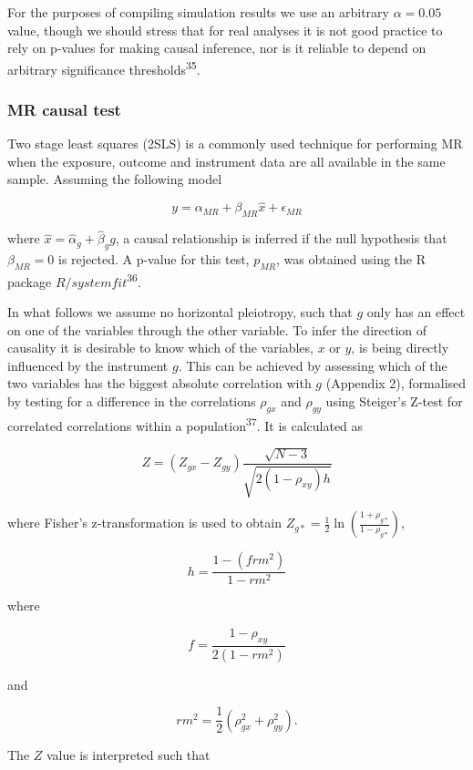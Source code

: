 \documentclass[]{article}
\begin{document}
For the purposes of compiling simulation results we use an arbitrary
\(\alpha = 0.05\) value, though we should stress that for real analyses
it is not good practice to rely on p-values for making causal inference,
nor is it reliable to depend on arbitrary significance
thresholds\textsuperscript{35}.

\subsubsection{MR causal test}\label{mr-causal-test}

Two stage least squares (2SLS) is a commonly used technique for
performing MR when the exposure, outcome and instrument data are all
available in the same sample. Assuming the following model

\[
y = \alpha_{MR} + \beta_{MR} \hat{x} + \epsilon_{MR}
\]

where \(\hat{x} = \hat{\alpha}_g + \hat{\beta}_g g\), a causal
relationship is inferred if the null hypothesis that \(\beta_{MR} = 0\)
is rejected. A p-value for this test, \(p_{MR}\), was obtained using the
R package \(R/systemfit\)\textsuperscript{36}.

In what follows we assume no horizontal pleiotropy, such that \(g\) only
has an effect on one of the variables through the other variable. To
infer the direction of causality it is desirable to know which of the
variables, \(x\) or \(y\), is being directly influenced by the
instrument \(g\). This can be achieved by assessing which of the two
variables has the biggest absolute correlation with \(g\) (Appendix 2),
formalised by testing for a difference in the correlations \(\rho_{gx}\)
and \(\rho_{gy}\) using Steiger's Z-test for correlated correlations
within a population\textsuperscript{37}. It is calculated as

\[
Z = (Z_{gx} - Z_{gy}) \frac{\sqrt{N-3}}{\sqrt{2(1-\rho_{xy})h}}
\]

where Fisher's z-transformation is used to obtain
\(Z_{g*} = \frac{1}{2} \ln \left ( \frac{1+\rho_{g*}}{1-\rho_{g*}} \right )\),

\[
h = \frac{1 - (frm^2)} {1 - rm^2}
\]

where

\[
f = \frac{1 - \rho_{xy}}{2(1 - rm^2)}
\]

and

\[
rm^2 = \frac{1}{2}(\rho_{gx}^2 + \rho_{gy}^2).
\]

The \(Z\) value is interpreted such that
\end{document}
